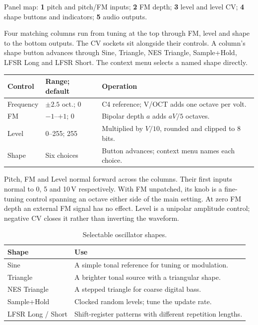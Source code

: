 Panel map: \textbf{1} pitch and pitch/FM inputs;
\textbf{2} FM depth;
\textbf{3} level and level CV;
\textbf{4} shape buttons and indicators;
\textbf{5} audio outputs.

Four matching columns run from tuning at the top through FM, level and
shape to the bottom outputs. The CV sockets sit alongside their controls. A column's shape button advances through Sine,
Triangle, NES Triangle, Sample+Hold, LFSR Long and LFSR Short. The context
menu selects a named shape directly.

\begin{tabularx}{\textwidth}{@{}l l X@{}}
\toprule Control & Range; default & Operation \\\midrule
Frequency & $\pm2.5$ oct.; 0 & C4 reference; V/OCT adds one octave per volt. \\
FM & $-1$--$+1$; 0 & Bipolar depth $a$ adds $aV/5$ octaves. \\
Level & 0--255; 255 & Multiplied by $V/10$, rounded and clipped to 8 bits. \\
Shape & Six choices & Button advances; context menu names each choice. \\
\bottomrule
\end{tabularx}

Pitch, FM and Level normal forward across the columns. Their first inputs
normal to 0, 5 and 10\,V respectively. With FM unpatched, its knob is a
fine-tuning control spanning an octave either side of the main setting.
At zero FM depth an external FM signal has no effect. Level is a unipolar
amplitude control; negative CV closes it rather than inverting the waveform.

\begin{table}[ht]\centering
\begin{tabularx}{\textwidth}{@{}lX@{}}
\toprule Shape & Use \\\midrule
Sine & A simple tonal reference for tuning or modulation. \\
Triangle & A brighter tonal source with a triangular shape. \\
NES Triangle & A stepped triangle for coarse digital bass. \\
Sample+Hold & Clocked random levels; tune the update rate. \\
LFSR Long / Short & Shift-register patterns with different repetition lengths. \\
\bottomrule
\end{tabularx}
\caption{Selectable oscillator shapes.}\label{tab:oscillator-shapes}
\end{table}
